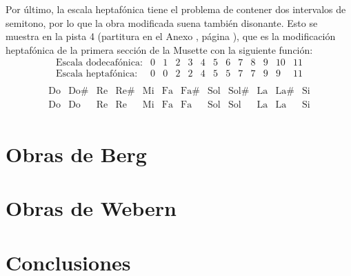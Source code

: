    	Por último, la escala heptafónica tiene el problema de contener dos intervalos de semitono, por lo que la obra modificada suena también disonante. Esto se muestra en la pista 4 (partitura en el Anexo , página ), que es la modificación heptafónica de la primera sección de la Musette con la siguiente función:
   	\[\left.\begin{matrix}\text{Escala dodecafónica:}&0&1&2&3&4&5&6&7&8&9&10&11\\\text{Escala heptafónica:}&0&0&2&2&4&5&5&7&7&9&9&11\\\end{matrix}\right.\]
   	\[\left.\begin{matrix}\text{Do}&\text{Do\#}&\text{Re}&\text{Re\#}&\text{Mi}&\text{Fa}&\text{Fa\#}&\text{Sol}&\text{Sol\#}&\text{La}&\text{La\#}&\text{Si}\\\text{Do}&\text{Do}&\text{Re}&\text{Re}&\text{Mi}&\text{Fa}&\text{Fa}&\text{Sol}&\text{Sol}&\text{La}&\text{La}&\text{Si}\\\end{matrix}\right.\]	
   
    \section{Obras de Berg}
    \section{Obras de Webern}
    \section{Conclusiones}